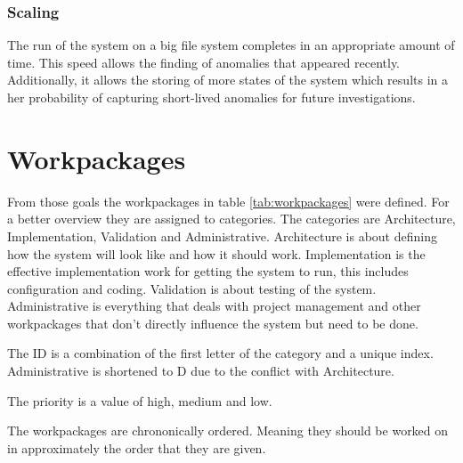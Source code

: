 \documentclass[
	a4paper,					%
	10pt,							%
	twoside,					%
	openright,				%
	notitlepage,			%
	parskip=half,			%
]{scrreprt}					%
\begin{document}
\subsubsection{Scaling}
The run of the system on a big file system completes in an appropriate amount of time. This speed allows the finding of anomalies that appeared recently. Additionally, it allows the storing of more states of the system which results in a her probability of capturing short-lived anomalies for future investigations. 

\section{Workpackages}

From those goals the workpackages in table \ref{tab:workpackages} were defined. For a better overview they are assigned to categories. The categories are Architecture, Implementation, Validation and Administrative. Architecture is about defining how the system will look like and how it should work. Implementation is the effective implementation work for getting the system to run, this includes configuration and coding. Validation is about testing of the system. Administrative is everything that deals with project management and other workpackages that don't directly influence the system but need to be done.

The ID is a combination of the first letter of the category and a unique index. Administrative is shortened to D due to the conflict with Architecture.

The priority is a value of high, medium and low. 

The workpackages are chrononically ordered. Meaning they should be worked on in approximately the order that they are given. 
\end{document}
